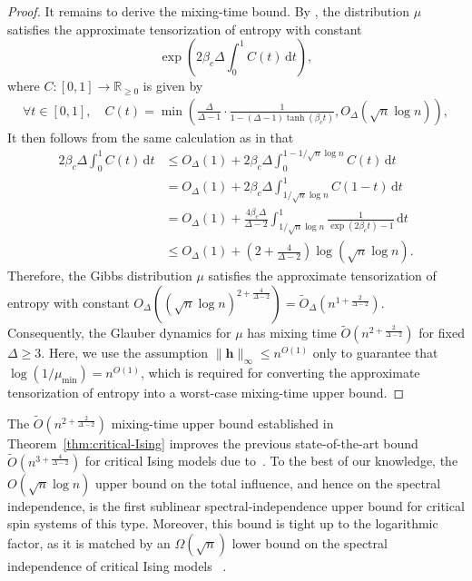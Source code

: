 \documentclass[11pt,a4paper]{article}
\theoremstyle{plain}
\begin{document}
\begin{proof}
It remains to derive the mixing-time bound.
By \cite[proof of the upper bound in Theorem 1.2]{chen2025uniqueness}, the distribution $\mu$ satisfies the approximate tensorization of entropy with constant 
\[
\exp\left(2\beta_c\Delta \int_0^{1} C(t)\,\mathrm{d} t\right),
\]
where $C:[0,1] \to \mathbb{R}_{\ge 0}$ is given by
    \begin{align*}
        \forall t \in [0,1],\quad C(t) = 
            \min\left(\frac{\Delta}{\Delta-1} \cdot \frac{1}{1-(\Delta-1) \tanh (\beta_c t)}, O_\Delta(\sqrt{n}\log n)\right),
    \end{align*}
It then follows from the same calculation as in  \cite{chen2025uniqueness} that 
\begin{align*}
    2\beta_c\Delta \int_0^{1} C(t)\,\mathrm{d} t
    &\le O_\Delta(1) + 2\beta_c\Delta \int_0^{1-1/\sqrt{n}\log n} C(t)\,\mathrm{d} t\\
    &=O_\Delta(1) + 2\beta_c\Delta \int_{1/\sqrt{n}\log n}^{1} C(1-t)\,\mathrm{d} t\\
    &=O_\Delta(1) + \frac{4\beta_c \Delta}{\Delta-2} \int_{1/\sqrt{n}\log n}^{1} \frac{1}{\exp (2 \beta_c t) - 1} \,\mathrm{d} t\\
    &\le O_\Delta(1) +\left(2+\frac{4}{\Delta-2}\right)\log(\sqrt{n}\log n).
\end{align*}
Therefore, the Gibbs distribution $\mu$ satisfies the approximate tensorization of entropy with constant ${O}_{\Delta}\left((\sqrt{n}\log n)^{2+\frac{4}{\Delta-2}}\right)=\widetilde{O}_{\Delta}\left(n^{1+\frac{2}{\Delta-2}}\right)$.
Consequently, the Glauber dynamics for $\mu$ has mixing time $\widetilde{O}\left(n^{2+\frac{2}{\Delta-2}}\right)$ for fixed $\Delta\ge 3$. 
Here, we use the assumption $\|\boldsymbol h\|_\infty\le n^{O(1)}$ only to guarantee that $\log(1/\mu_{\min})=n^{O(1)}$, which is required for converting the approximate tensorization of entropy into a worst-case mixing-time upper bound.
\end{proof}

The $\widetilde{O}\!\left(n^{2+\frac{2}{\Delta-2}}\right)$ mixing-time upper bound established in Theorem~\ref{thm:critical-Ising} improves the previous state-of-the-art bound $\widetilde{O}\!\left(n^{3+\frac{4}{\Delta-2}}\right)$ for critical Ising models due to~\cite{chen2025uniqueness}.
To the best of our knowledge, the $O(\sqrt n\log n)$ upper bound on the total influence, and hence on the spectral independence, is the first sublinear spectral-independence upper bound for critical spin systems of this type. 
Moreover, this bound is tight up to the logarithmic factor, as it is matched by an $\Omega(\sqrt n)$ lower bound on the spectral independence of critical Ising models~\cite[Theorem 5.2 and Corollary 5.3]{chen2025uniqueness} .
\end{document}

